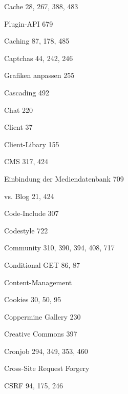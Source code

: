 \documentclass{book}
\renewcommand\subitem{\par}
\begin{document}
\begin{multicols}{2}
\begin{osp-index}
  \item Cache\hspace{1mm} 28, 267, 388, 483
    \subitem Plugin-API\hspace{1mm} 679
  \item Caching\hspace{1mm} 87, 178, 485
  \item Captchas\hspace{1mm} 44, 242, 246
    \subitem Grafiken anpassen\hspace{1mm} 255
  \item Cascading\hspace{1mm} 492
  \item Chat\hspace{1mm} 220
  \item Client\hspace{1mm} 37
  \item Client-Libary\hspace{1mm} 155
  \item CMS\hspace{1mm} 317, 424
    \subitem Einbindung der Mediendatenbank\hspace{1mm} 709
    \subitem vs. Blog\hspace{1mm} 21, 424
  \item Code-Include\hspace{1mm} 307
  \item Codestyle\hspace{1mm} 722
  \item Community\hspace{1mm} 310, 390, 394, 408, 717
  \item Conditional GET\hspace{1mm} 86, 87
  \item Content-Management\hspace{1mm} 
  \item Cookies\hspace{1mm} 30, 50, 95
  \item Coppermine Gallery\hspace{1mm} 230
  \item Creative Commons\hspace{1mm} 397
  \item Cronjob\hspace{1mm} 294, 349, 353, 460
  \item Cross-Site Request Forgery\hspace{1mm} 
  \item CSRF\hspace{1mm} 94, 175, 246

\end{osp-index}
\end{multicols}
\end{document}
